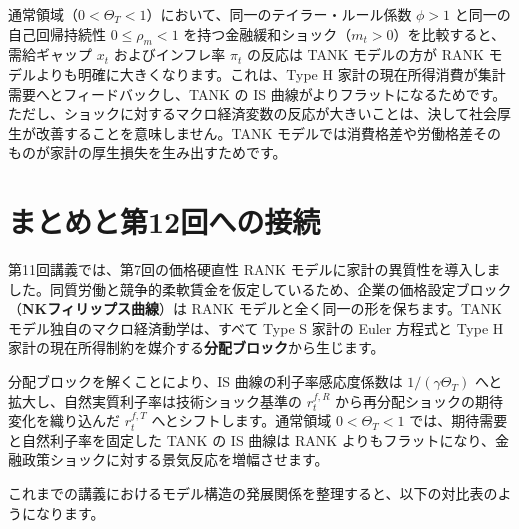 \documentclass[
  japanese,
  lualatex,
  ja=standard,
  12pt,
  a4paper]{ltjsarticle}
\begin{document}

\begin{tcolorbox}[enhanced jigsaw, arc=.35mm, bottomrule=.15mm, bottomtitle=1mm, breakable, colback=white, colbacktitle=quarto-callout-important-color!10!white, colframe=quarto-callout-important-color-frame, coltitle=black, left=2mm, leftrule=.75mm, opacityback=0, opacitybacktitle=0.6, rightrule=.15mm, title=\textcolor{quarto-callout-important-color}{\faExclamation}\hspace{0.5em}{金融政策ショックへの含意}, titlerule=0mm, toprule=.15mm, toptitle=1mm]

通常領域（\(0<\Theta_T<1\)）において、同一のテイラー・ルール係数
\(\phi>1\) と同一の自己回帰持続性 \(0 \leq \rho_m < 1\)
を持つ金融緩和ショック（\(m_t>0\)）を比較すると、需給ギャップ \(x_t\)
およびインフレ率 \(\pi_t\) の反応は TANK モデルの方が RANK
モデルよりも明確に大きくなります。これは、Type H
家計の現在所得消費が集計需要へとフィードバックし、TANK の IS
曲線がよりフラットになるためです。ただし、ショックに対するマクロ経済変数の反応が大きいことは、決して社会厚生が改善することを意味しません。TANK
モデルでは消費格差や労働格差そのものが家計の厚生損失を生み出すためです。

\end{tcolorbox}

\section{まとめと第12回への接続}\label{ux307eux3068ux3081ux3068ux7b2c12ux56deux3078ux306eux63a5ux7d9a}

第11回講義では、第7回の価格硬直性 RANK
モデルに家計の異質性を導入しました。同質労働と競争的柔軟賃金を仮定しているため、企業の価格設定ブロック（\textbf{NKフィリップス曲線}）は
RANK モデルと全く同一の形を保ちます。TANK
モデル独自のマクロ経済動学は、すべて Type S 家計の Euler 方程式と Type H
家計の現在所得制約を媒介する\textbf{分配ブロック}から生じます。

分配ブロックを解くことにより、IS 曲線の利子率感応度係数は
\(1/(\gamma \Theta_T)\) へと拡大し、自然実質利子率は技術ショック基準の
\(r_t^{f,R}\) から再分配ショックの期待変化を織り込んだ \(r_t^{f,T}\)
へとシフトします。通常領域 \(0<\Theta_T<1\)
では、期待需要と自然利子率を固定した TANK の IS 曲線は RANK
よりもフラットになり、金融政策ショックに対する景気反応を増幅させます。


これまでの講義におけるモデル構造の発展関係を整理すると、以下の対比表のようになります。
\end{document}
